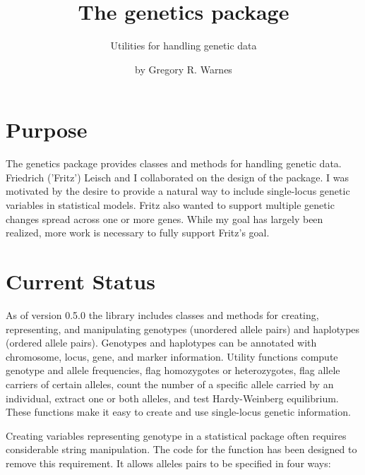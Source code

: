 \documentclass{report}
\begin{document}
\author{by Gregory R. Warnes}
\title{The genetics package}
\subtitle{Utilities for handling genetic data}

\maketitle

\section{Purpose}

The genetics package provides classes and methods for handling genetic
data.  Friedrich ('Fritz') Leisch and I collaborated on the design of
the package.  I was motivated by the desire to provide a natural way
to include single-locus genetic variables in statistical models.
Fritz also wanted to support multiple genetic changes spread across
one or more genes.  While my goal has largely been realized, more work
is necessary to fully support Fritz's goal.

\section{Current Status}

As of version 0.5.0 the library includes classes and methods for
creating, representing, and manipulating genotypes (unordered allele
pairs) and haplotypes (ordered allele pairs).  Genotypes and
haplotypes can be annotated with chromosome, locus, gene, and marker
information. Utility functions compute genotype and allele
frequencies, flag homozygotes or heterozygotes, flag allele carriers
of certain alleles, count the number of a specific allele carried by
an individual, extract one or both alleles, and test Hardy-Weinberg
equilibrium.  These functions make it easy to create and use
single-locus genetic information.

Creating variables representing genotype in a statistical package
often requires considerable string manipulation.  The code for the
 function has been designed to remove this requirement.
It allows alleles pairs to be specified in four ways:
\end{document}
